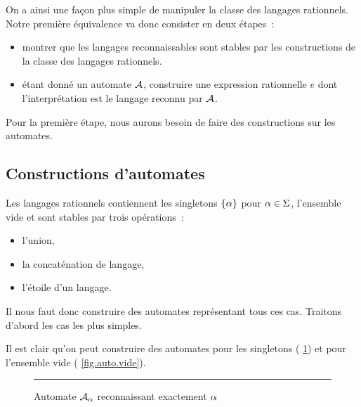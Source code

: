 On a ainsi une façon plus simple de manipuler la classe des langages rationnels.
Notre première équivalence va donc consister en deux étapes~:
\begin{itemize}
\item montrer que les langages reconnaissables sont stables par les
  constructions de la classe des langages rationnels.
\item étant donné un automate $\mathcal{A}$, construire une expression rationnelle
  $e$ dont l'interprétation est le langage reconnu par $\mathcal{A}$.
\end{itemize}

Pour la première étape, nous aurons besoin de faire des constructions sur les
automates.

\subsection{Constructions d'automates}

Les langages rationnels contiennent les singletons $\{\alpha\}$ pour
$\alpha \in \Sigma$, l'ensemble vide et sont stables par trois opérations~:
\begin{itemize}
\item l'union,
\item la concaténation de langage,
\item l'étoile d'un langage.
\end{itemize}

Il nous faut donc construire des automates représentant tous ces cas. Traitons
d'abord les cas les plus simples.

Il est clair qu'on peut construire des automates pour les singletons
( \cref{fig.auto.a}) et pour l'ensemble vide
( \cref{fig.auto.vide}).

\begin{figure}[t]
  \centering

  \vspace{0.2cm}
  \hrule

  \vspace{0.2cm}
  \caption{Automate $\mathcal{A}_{\alpha}$ reconnaissant exactement $\alpha$}
  \label{fig.auto.a}
\end{figure}

